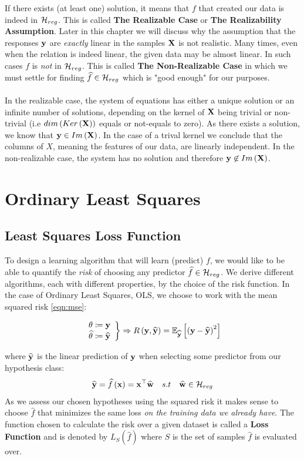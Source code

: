 If there exists (at least one) solution, it means that $f$ that created our data is indeed in $\mathcal{H}_{reg}$. This is called \textbf{The Realizable Case} or \textbf{The Realizability Assumption}. Later in this chapter we will discuss why the assumption that the responses $\mathbf{y}$ are \textit{exactly} linear in the samples $\mathbf{X}$ is not realistic. Many times, even when the relation is indeed linear, the given data may be almost linear. In such cases $f$ is \textit{not} in $\mathcal{H}_{reg}$. This is called \textbf{The Non-Realizable Case} in which we must settle for finding $\widehat{f}\in\mathcal{H}_{reg}$ which is "good enough" for our purposes.
\\~\\
In the realizable case, the system of equations has either a unique solution or an infinite number of solutions, depending on the kernel of $\mathbf{X}$ being trivial or non-trivial (i.e $dim\left(Ker\left(\mathbf{X}\right)\right)$ equals or not-equals to zero). As there exists a solution, we know that $\mathbf{y}\in Im\left(\mathbf{X}\right)$. In the case of a trival kernel we conclude that the columns of $X$, meaning the features of our data, are linearly independent. In the non-realizable case, the system has no solution and therefore $\mathbf{y}\not\in Im\left(\mathbf{X}\right)$.



\section{Ordinary Least Squares}
\subsection{Least Squares Loss Function} %
To design a learning algorithm that will learn (predict) $f$, we would like to be able to quantify the \textit{risk} of choosing any predictor $\widehat{f}\in\mathcal{H}_{reg}$. We derive different algorithms, each with different properties, by the choice of the risk function. In the case of Ordinary Least Squares, OLS, we choose to work with the mean squared risk \eqref{eqn:mse}: 

$$
\left.\begin{array}{c}
\theta \coloneqq \mathbf{y}\\
\widehat{\theta} \coloneqq \widehat{\mathbf{y}}
\end{array}\right\} \Rightarrow R\left(\mathbf{y},\widehat{\mathbf{y}}\right)=\mathbb{E}_{\widehat{\mathbf{y}}}\left[\left(\mathbf{y}-\widehat{\mathbf{y}}\right)^2\right]
$$

where $\widehat{\mathbf{y}}$ is the linear prediction of $\mathbf{y}$ when selecting some predictor from our hypothesis class: 
$$ \widehat{\mathbf{y}}=\widehat{f}\left(\mathbf{x}\right)=\mathbf{x}^\top\widehat{\mathbf{w}}\quad s.t \quad \widehat{\mathbf{w}}\in \mathcal{H}_{reg} $$
As we assess our chosen hypotheses using the squared risk it makes sense to choose $\widehat{f}$ that minimizes the same loss \textit{on the training data we already have}. The function chosen to calculate the risk over a given dataset is called a \textbf{Loss Function} and is denoted by $L_S\left(\widehat{f}\right)$ where $S$ is the set of samples $\widehat{f}$ is evaluated over.

